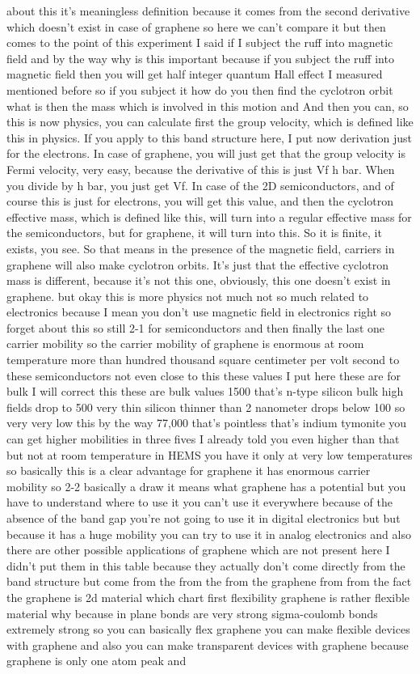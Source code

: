 about this it's meaningless definition because it comes from the second derivative which doesn't exist in case of graphene so here we can't compare it but then comes to the point of this experiment I said if I subject the ruff into magnetic field and by the way why is this important because if you subject the ruff into magnetic field then you will get half integer quantum Hall effect I measured mentioned before so if you subject it how do you then find the cyclotron orbit what is then the mass which is involved in this motion and And then you can, so this is now physics, you can calculate first the group velocity, which is defined like this in physics. If you apply to this band structure here, I put now derivation just for the electrons. In case of graphene, you will just get that the group velocity is Fermi velocity, very easy, because the derivative of this is just Vf h bar. When you divide by h bar, you just get Vf. In case of the 2D semiconductors, and of course this is just for electrons, you will get this value, and then the cyclotron effective mass, which is defined like this, will turn into a regular effective mass for the semiconductors, but for graphene, it will turn into this. So it is finite, it exists, you see. So that means in the presence of the magnetic field, carriers in graphene will also make cyclotron orbits. It's just that the effective cyclotron mass is different, because it's not this one, obviously, this one doesn't exist in graphene. but okay this is more physics not much not so much related to electronics because I mean you don't use magnetic field in electronics right so forget about this so still 2-1 for semiconductors and then finally the last one carrier mobility so the carrier mobility of graphene is enormous at room temperature more than hundred thousand square centimeter per volt second to these semiconductors not even close to this these values I put here these are for bulk I will correct this these are bulk values 1500 that's n-type silicon bulk high fields drop to 500 very thin silicon thinner than 2 nanometer drops below 100 so very very low this by the way 77,000 that's pointless that's indium tymonite you can get higher mobilities in three fives I already told you even higher than that but not at room temperature in HEMS you have it only at very low temperatures so basically this is a clear advantage for graphene it has enormous carrier mobility so 2-2 basically a draw it means what graphene has a potential but you have to understand where to use it you can't use it everywhere because of the absence of the band gap you're not going to use it in digital electronics but but because it has a huge mobility you can try to use it in analog electronics and also there are other possible applications of graphene which are not present here I didn't put them in this table because they actually don't come directly from the band structure but come from the from the from the graphene from from the fact the graphene is 2d material which chart first flexibility graphene is rather flexible material why because in plane bonds are very strong sigma-coulomb bonds extremely strong so you can basically flex graphene you can make flexible devices with graphene and also you can make transparent devices with graphene because graphene is only one atom peak and 